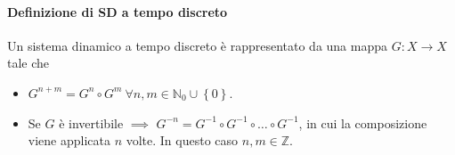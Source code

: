 \paragraph{Definizione di SD a tempo discreto}%
\label{par:Definizione di SD a tempo discreto}
\begin{defn}
    Un sistema dinamico a tempo discreto è rappresentato da una mappa $G: X\to X$ tale che
    \begin{itemize}
        \item $G^{n+m} = G^n \circ G^m \ \forall n, m \in \mathbb{N}_0 \cup \left\{0\right\}$.
	\item Se $G$ è invertibile $\implies$ $G^{-n} = G^{-1}\circ G^{-1} \circ \ldots \circ G^{-1}$, in cui la composizione viene applicata $n$ volte.
	    In questo caso $n, m \in \mathbb{Z}$.
    \end{itemize}
\end{defn}
\noindent
